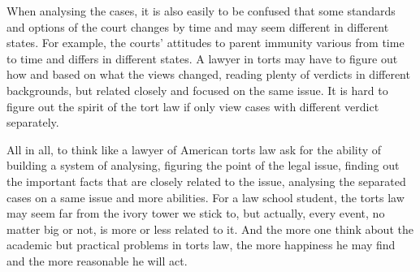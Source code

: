 \documentclass[10pt,a4paper]{ctexart}
\begin{document}
When analysing the cases, it is also easily to be confused that some standards and options of the court changes by time and may seem different in different states. For example, the courts’ attitudes to parent immunity various from time to time and differs in different states. A lawyer in torts may have to figure out how and based on what the views changed, reading plenty of verdicts in different backgrounds, but related closely and focused on the same issue. It is hard to figure out the spirit of the tort law if only view cases with different verdict separately. 

All in all, to think like a lawyer of American torts law ask for the ability of building a system of analysing, figuring the point of the legal issue, finding out the important facts that are closely related to the issue, analysing the separated cases on a same issue and more abilities. For a law school student, the torts law may seem far from the ivory tower we stick to, but actually, every event, no matter big or not, is more or less related to it. And the more one think about the academic but practical problems in torts law, the more happiness he may find and the more reasonable he will act. 
\end{document}

